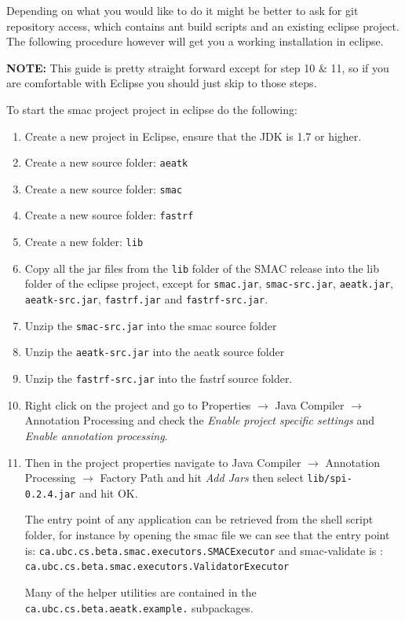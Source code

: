 \documentclass[manual.tex]{subfiles}
\begin{document}
Depending on what you would like to do it might be better to ask for git repository access, which contains ant build scripts and an existing eclipse project. The following procedure however will get you a working installation in eclipse. 

\textbf{NOTE:} This guide is pretty straight forward except for step 10 \& 11, so if you are comfortable with Eclipse you should just skip to those steps.

To start the smac project project in eclipse do the following:
\begin{enumerate}

\item Create a new project in Eclipse, ensure that the JDK is 1.7 or higher.

\item Create a new source folder: \texttt{aeatk}

\item Create a new source folder: \texttt{smac}

\item Create a new source folder: \texttt{fastrf}

\item Create a new folder: \texttt{lib}

\item Copy all the jar files from the \texttt{lib} folder of the SMAC release into the lib folder of the eclipse project, except for \texttt{smac.jar}, \texttt{smac-src.jar}, \texttt{aeatk.jar}, \texttt{aeatk-src.jar}, \texttt{fastrf.jar} and \texttt{fastrf-src.jar}.

\item Unzip the \texttt{smac-src.jar} into the smac source folder

\item Unzip the \texttt{aeatk-src.jar} into the aeatk source folder

\item Unzip the \texttt{fastrf-src.jar} into the fastrf source folder.

\item Right click on the project and go to Properties $\rightarrow$ Java Compiler $\rightarrow$ Annotation Processing and check the \emph{Enable project specific settings} and \emph{Enable annotation processing}.

\item Then in the project properties navigate to Java Compiler $\rightarrow$ Annotation Processing $\rightarrow$ Factory Path and hit \emph{Add Jars} then select \texttt{lib/spi-0.2.4.jar} and hit OK.

The entry point of any application can be retrieved from the shell script folder, for instance by opening the smac file we can see that the entry point is: \texttt{ca.ubc.cs.beta.smac.executors.SMACExecutor} and smac-validate is : \texttt{ca.ubc.cs.beta.smac.executors.ValidatorExecutor}

Many of the helper utilities are contained in the \texttt{ca.ubc.cs.beta.aeatk.example.} subpackages.

\end{enumerate}
\end{document}
